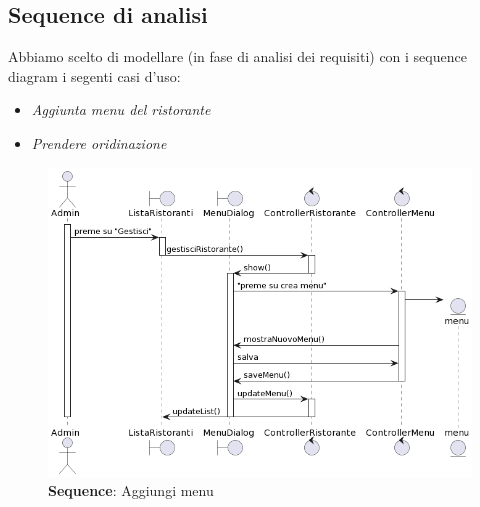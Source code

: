\subsection{Sequence di analisi}

    \begin{flushleft}
        Abbiamo scelto di modellare (in fase di analisi dei requisiti) con i sequence diagram i segenti casi d'uso:
        \begin{itemize}
            \item  \emph{Aggiunta menu del ristorante}
            \item  \emph{Prendere oridinazione}
        \end{itemize}
    \end{flushleft}

    \begin{figure}[H]
        \centering
        \includegraphics[scale=0.6]{assets/diagrammi/Sequence di analisi/sequence_add_menu.png}
        \caption{\textbf{Sequence}: Aggiungi menu}\label{fig:seq_add_menu}
    \end{figure}